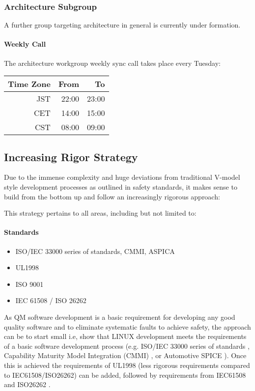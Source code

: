 \documentclass[12pt]{ElisaPaper}
\begin{document}
\subsubsection{Architecture Subgroup}
A further group targeting architecture in general is currently under formation.
\paragraph{Weekly Call}
The architecture workgroup weekly sync call takes place every Tuesday:

\begin{center}
\begin{tabular}{rrr}
	\toprule
	Time Zone & From & To\\
	\midrule
	JST & 22:00 & 23:00 \\
	CET	& 14:00 & 15:00 \\
	CST & 08:00 & 09:00 \\
	\bottomrule 
\end{tabular}
\end{center}

\subsection{Increasing Rigor Strategy}
Due to the immense complexity and huge deviations from traditional V-model style development processes as outlined in safety standards, it makes sense to build from the bottom up and follow an increasingly rigorous approach:

This strategy pertains to all areas, including but not limited to:
\paragraph{Standards}
\begin{itemize}
	\item ISO/IEC 33000 series of standards, CMMI, ASPICA \cite{ISO3300x:2015,CMMI,ASPICE}
	\item UL1998 \cite{UL1998}
	\item ISO 9001 \cite{ISO9001:2015}
	\item IEC 61508 / ISO 26262 \cite{IEC61508:2010,ISO26262:2018}
\end{itemize}
As QM software development is a basic requirement for developing any good quality software and to eliminate systematic faults to achieve safety, the approach can be to start small i.e, show that LINUX development meets the requirements of a basic software development process (e.g. ISO/IEC 33000 series of standards \cite{ISO3300x:2015}, Capability Maturity Model Integration (CMMI) \cite{CMMI}, or Automotive SPICE \cite{ASPICE}).
Once this is achieved the requirements of UL1998 \cite{UL1998} (less rigorous requirements compared to IEC61508/ISO26262) can be added, followed by requirements from IEC61508 and ISO26262 \cite{IEC61508:2010,ISO26262:2018}.
\end{document}
